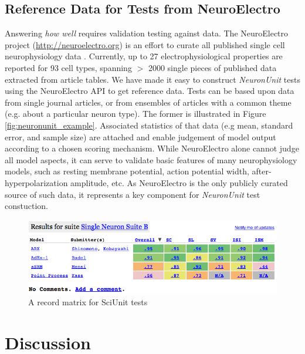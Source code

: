 \documentclass{frontiersSCNS}
\begin{document}
\subsection{Reference Data for Tests from NeuroElectro}
Answering \textit{how well} requires validation testing against data. 
The NeuroElectro project (\url{http://neuroelectro.org}) is an effort to curate all published single cell neurophysiology data \citep{tripathy_neuroelectro:_2012}.  
Currently, up to 27 electrophysiological properties are reported for 93 cell types, spanning $>$ 2000 single pieces of published data extracted from article tables. 
We have made it easy to construct \textit{NeuronUnit} tests using the NeuroElectro API to get reference data. 
Tests can be based upon data from single journal articles, or from ensembles of articles with a common theme (e.g. about a particular neuron type). 
The former is illustrated in Figure \ref{fig:neuronunit_example}. 
Associated statistics of that data (e.g mean, standard error, and sample size) are attached and enable judgement of model output according to a chosen scoring mechanism. 
While NeuroElectro alone cannot judge all model aspects, it can serve to validate basic features of many neurophysiology models, such as resting membrane potential, action potential width, after-hyperpolarization amplitude, etc. 
As NeuroElectro is the only publicly curated source of such data, it represents a key component for \textit{NeuronUnit} test constuction.  

\begin{figure}%
\includegraphics[scale=0.65]{table.png}
\caption{A record matrix for SciUnit tests}
\label{fig:scidash_matrix}
\vspace{-25px}
\end{figure}
\vspace{-10px}
\leavevmode
\section{Discussion}\label{sec:discussion}
\end{document}
